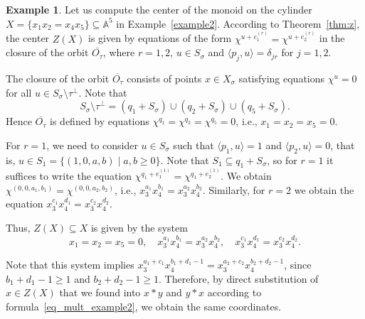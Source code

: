 \documentclass[a4paper, 11pt]{amsart}
\theoremstyle{plain}
\theoremstyle{remark}
\theoremstyle{definition}
\newtheorem{example}[theorem]{Example}
\renewcommand{\AA}{\mathbb{A}}
\begin{document}
\begin{example}
Let us compute the center of the monoid on the cylinder ${X = \{x_1x_2=x_4x_5\}\subseteq \AA^5}$ in Example~\ref{example2}. According to Theorem~\ref{thm:z}, the center $Z(X)$ is given by equations of the form $\chi^{u + e_1^{(r)}} =  \chi^{u + e_2^{(r)}}$ in the closure of the orbit $\overline{O_\tau}$, where $r = 1, 2$, $u \in S_\sigma$ and $\langle p_j, u \rangle = \delta_{jr}$ for $j = 1, 2$.  

The closure of the orbit $\overline{O_\tau}$ consists of points $x \in X_\sigma$ satisfying equations $\chi^u = 0$ for all $u \in S_\sigma \setminus \tau^\perp$. Note that \[S_\sigma \setminus \tau^\perp = (q_1 + S_\sigma) \cup (q_2 + S_\sigma) \cup (q_5 + S_\sigma).\]
Hence $\overline{O_\tau}$ is defined by equations $\chi^{q_1} = \chi^{q_2} = \chi^{q_5} = 0$, i.e., $x_1=x_2=x_5=0$.  

For $r=1$, we need to consider $u \in S_\sigma$ such that $\langle p_1, u\rangle = 1$ and $\langle p_2, u\rangle = 0$, that is, $u \in S_1 = \{(1, 0, a, b) \mid a,b \ge 0\}$. Note that $S_1 \subseteq q_1 + S_\sigma$, so for $r=1$ it suffices to write the equation $\chi^{q_1 + e_1^{(1)}} =  \chi^{q_1 + e_2^{(1)}}$. We obtain $\chi^{(0,0,a_1,b_1)} = \chi^{(0,0,a_2,b_2)}$, i.e., $x_3^{a_1}x_4^{b_1} = x_3^{a_2}x_4^{b_2}$. Similarly, for $r=2$ we obtain the equation $x_3^{c_1}x_4^{d_1} = x_3^{c_2}x_4^{d_2}$. 

Thus, $Z(X) \subseteq X$ is given by the system
\[x_1=x_2=x_5=0, \quad x_3^{a_1}x_4^{b_1} = x_3^{a_2}x_4^{b_2}, \quad x_3^{c_1}x_4^{d_1} = x_3^{c_2}x_4^{d_2}.\]

Note that this system implies $x_3^{a_1+c_1}x_4^{b_1+d_1-1} = x_3^{a_2+c_2}x_4^{b_2+d_2-1}$, since ${b_1+d_1-1\ge 1}$ and $b_2+d_2-1 \ge 1$. Therefore, by direct substitution of $x \in Z(X)$ that we found into $x*y$ and $y*x$ according to formula~\eqref{eq_mult_example2}, we obtain the same coordinates.
\end{example}
\end{document}
